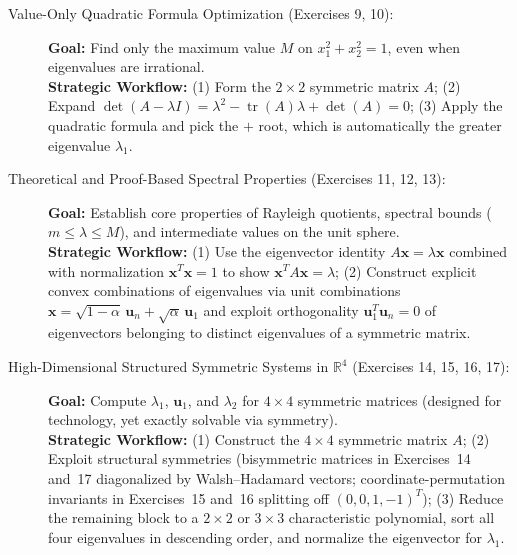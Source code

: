 \documentclass[11pt, letterpaper]{article}
\theoremstyle{definition}
\theoremstyle{remark}
\newcommand{\R}{\mathbb{R}}
\begin{document}
\begin{description}
    \item[Value-Only Quadratic Formula Optimization (Exercises 9, 10):]
    \textbf{Goal:} Find only the maximum value $M$ on $x_1^2 + x_2^2 = 1$, even when eigenvalues are irrational.\\
    \textbf{Strategic Workflow:} (1) Form the $2 \times 2$ symmetric matrix $A$; (2) Expand $\det(A - \lambda I) = \lambda^2 - \operatorname{tr}(A)\lambda + \det(A) = 0$; (3) Apply the quadratic formula and pick the $+$ root, which is automatically the greater eigenvalue $\lambda_1$.

    \item[Theoretical and Proof-Based Spectral Properties (Exercises 11, 12, 13):]
    \textbf{Goal:} Establish core properties of Rayleigh quotients, spectral bounds ($m \le \lambda \le M$), and intermediate values on the unit sphere.\\
    \textbf{Strategic Workflow:} (1) Use the eigenvector identity $A\mathbf{x} = \lambda \mathbf{x}$ combined with normalization $\mathbf{x}^T \mathbf{x} = 1$ to show $\mathbf{x}^T A \mathbf{x} = \lambda$; (2) Construct explicit convex combinations of eigenvalues via unit combinations $\mathbf{x} = \sqrt{1-\alpha}\,\mathbf{u}_n + \sqrt{\alpha}\,\mathbf{u}_1$ and exploit orthogonality $\mathbf{u}_1^T \mathbf{u}_n = 0$ of eigenvectors belonging to distinct eigenvalues of a symmetric matrix.

    \item[High-Dimensional Structured Symmetric Systems in $\R^4$ (Exercises 14, 15, 16, 17):]
    \textbf{Goal:} Compute $\lambda_1$, $\mathbf{u}_1$, and $\lambda_2$ for $4 \times 4$ symmetric matrices (designed for technology, yet exactly solvable via symmetry).\\
    \textbf{Strategic Workflow:} (1) Construct the $4 \times 4$ symmetric matrix $A$; (2) Exploit structural symmetries (bisymmetric matrices in Exercises~14 and~17 diagonalized by Walsh–Hadamard vectors; coordinate-permutation invariants in Exercises~15 and~16 splitting off $(0,0,1,-1)^T$); (3) Reduce the remaining block to a $2 \times 2$ or $3 \times 3$ characteristic polynomial, sort all four eigenvalues in descending order, and normalize the eigenvector for $\lambda_1$.
\end{description}
\end{document}
